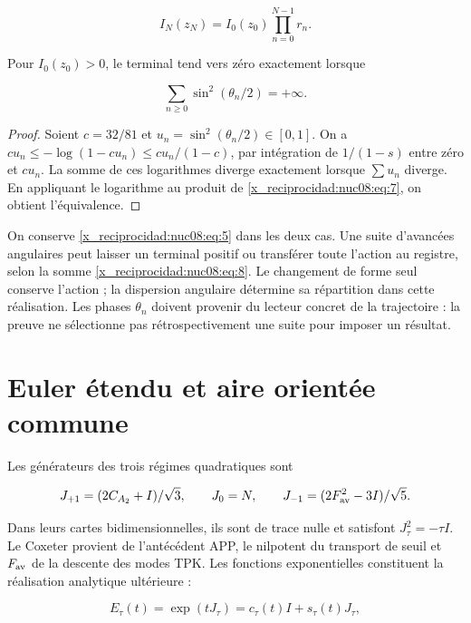 \begin{equation}
I_N(z_N)=I_0(z_0)\prod_{n=0}^{N-1}r_n.
\label{x_reciprocidad:nuc08:eq:7}
\end{equation}

\begin{theorem}
Pour \(I_0(z_0)>0\), le terminal tend vers zéro exactement lorsque

\begin{equation}
\sum_{n\ge0}\sin^2(\theta_n/2)=+\infty.
\label{x_reciprocidad:nuc08:eq:8}
\end{equation}
\end{theorem}

\begin{proof}
Soient \(c=32/81\) et \(u_n=\sin^2(\theta_n/2)\in[0,1]\). On a
\(cu_n\leq-\log(1-cu_n)\leq cu_n/(1-c)\), par intégration de \(1/(1-s)\) entre zéro et \(cu_n\). La somme de ces logarithmes diverge exactement lorsque \(\sum u_n\) diverge. En appliquant le logarithme au produit de \eqref{x_reciprocidad:nuc08:eq:7}, on obtient l’équivalence.
\end{proof}

On conserve \eqref{x_reciprocidad:nuc08:eq:5} dans les deux cas. Une suite d’avancées angulaires peut laisser un terminal positif ou transférer toute l’action au registre, selon la somme \eqref{x_reciprocidad:nuc08:eq:8}. Le changement de forme seul conserve l’action ; la dispersion angulaire détermine sa répartition dans cette réalisation. Les phases \(\theta_n\) doivent provenir du lecteur concret de la trajectoire : la preuve ne sélectionne pas rétrospectivement une suite pour imposer un résultat.

\section{Euler étendu et aire orientée commune}

Les générateurs des trois régimes quadratiques sont

\[
J_{+1}=(2C_{A_2}+I)/\sqrt3,\qquad
J_0=N,\qquad
J_{-1}=(2F_{\rm av}^2-3I)/\sqrt5.
\]

Dans leurs cartes bidimensionnelles, ils sont de trace nulle et satisfont
\(J_\tau^2=-\tau I\). Le Coxeter provient de l’antécédent APP, le nilpotent du transport de seuil et \(F_{\rm av}\) de la descente des modes TPK. Les fonctions exponentielles constituent la réalisation analytique ultérieure :


\[
E_\tau(t)=\exp(tJ_\tau)=c_\tau(t)I+s_\tau(t)J_\tau,
\]

